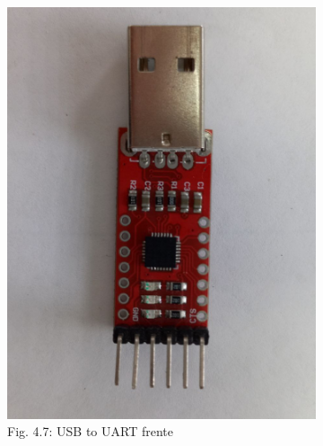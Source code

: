 \documentclass[12pt]{article}
\begin{document}
\begin{figure}[ht]
  \centering
  \begin{subfigure}[b]{0.45\linewidth}
    \includegraphics[width=\linewidth]{images/USB-UART-1.jpg}
    \caption{Fig. 4.7: USB to UART frente}
  \end{subfigure}
  \begin{subfigure}[b]{0.45\linewidth}

\end{subfigure}
\end{figure}
\end{document}
